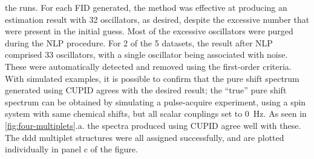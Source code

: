 the runs. For each \ac{FID} generated, the method was effective at producing an
estimation result with 32 oscillators, as desired, despite the excessive number
that were present in the initial guess. Most of the excessive oscillators were
purged during the \ac{NLP} procedure.
For 2 of the 5 datasets, the result after \ac{NLP} comprised 33
oscillators, with a single oscillator being associated with noise. These were
automatically detected and removed using the first-order criteria. With
simulated examples, it is possible to confirm that the pure shift spectrum
generated using \ac{CUPID} agrees with the desired result;
the ``true'' pure shift spectrum can be obtained by simulating a pulse-acquire
experiment, using a spin system with same chemical shifts, but all scalar
couplings set to \qty{0}{\hertz}. As seen in
\cref{fig:four-multiplets}.a. the spectra produced using \ac{CUPID} agree well
with these. The ddd multiplet structures were all assigned successfully, and
are plotted individually in panel c of the figure.


